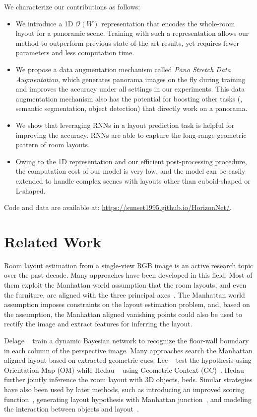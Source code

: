 \documentclass[10pt,twocolumn,letterpaper]{article}
\begin{document}
We characterize our contributions as follows:
\begin{itemize}
    \item We introduce a 1D $\mathcal{O}(W)$ representation that encodes the whole-room layout for a panoramic scene. Training with such a representation allows our method to outperform previous state-of-the-art results, yet requires fewer parameters and less computation time.
    \item We propose a data augmentation mechanism called \textit{Pano Stretch Data Augmentation}, which generates panorama images on the fly during training and improves the accuracy under all settings in our experiments. This data augmentation mechanism also has the potential for boosting other tasks (\eg, semantic segmentation, object detection) that directly work on a panorama.
    \item We show that leveraging RNNs in a layout prediction task is helpful for improving the accuracy. RNNs are able to capture the long-range geometric pattern of room layouts.
    \item Owing to the 1D representation and our efficient post-processing procedure, the computation cost of our model is very low, and the model can be easily extended to handle complex scenes with layouts other than cuboid-shaped or L-shaped.
\end{itemize}

\noindent Code and data are available at: \url{https://sunset1995.github.io/HorizonNet/}.
 
\section{Related Work}

Room layout estimation from a single-view RGB image is an active research topic over the past decade. Many approaches have been developed in this field. Most of them exploit the Manhattan world assumption that the room layouts, and even the furniture, are aligned with the three principal axes~\cite{coughlan1999manhattan}. The Manhattan world assumption imposes constraints on the layout estimation problem, and, based on the assumption, the Manhattan aligned vanishing points could also be used to rectify the image and extract features for inferring the layout.

Delage \etal~\cite{delage2006dynamic} train a dynamic Bayesian network to recognize the floor-wall boundary in each column of the perspective image. Many approaches search the Manhattan aligned layout based on extracted geometric cues. Lee \etal~\cite{lee2009geometric} test the hypothesis using Orientation Map (OM) while Hedau \etal~\cite{hedau2009recovering} using Geometric Context (GC)~\cite{hoiem2007recovering}. Hedau \etal~\cite{gupta2010estimating} further jointly inference the room layout with 3D objects, \eg beds. Similar strategies have also been used by later methods, such as introducing an improved scoring function~\cite{schwing2012efficient,urtasun2012efficient}, generating layout hypothesis with Manhattan junction~\cite{ramalingam2013manhattan}, and modeling the interaction between objects and layout~\cite{del2013understanding,gupta2010estimating,zhao2013scene}.
\end{document}
